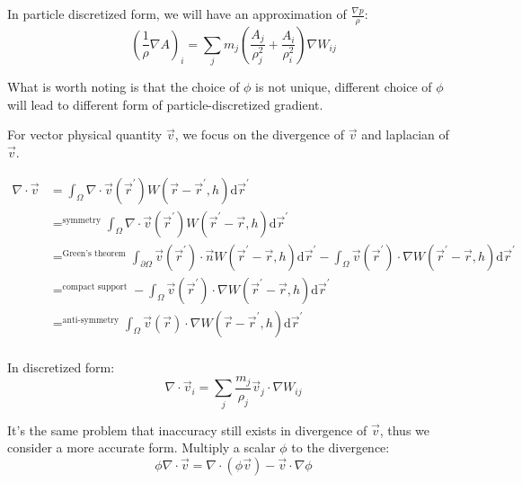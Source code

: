 In particle discretized form, we will have an approximation of $\frac{\nabla p}{\rho}$:
\begin{equation}
    \left(\frac{1}{\rho}\nabla A\right)_i
    =
    \sum_j m_j
    \left(
        \frac{A_j}{\rho_j^2}
        +
        \frac{A_i}{\rho_i^2}
    \right)\nabla W_{ij}
\end{equation}

What is worth noting
is that the choice of $\phi$ is not unique, 
different choice of $\phi$ will lead to different form of particle-discretized gradient.

For vector physical quantity $\vec{v}$,
we focus on the divergence of $\vec{v}$ and laplacian of $\vec{v}$.

\begin{equation}
    \begin{aligned}
        \nabla\cdot \vec{v} &=
        \int_{\Omega} \nabla\cdot \vec{v}(\vec{r}^\prime) W(\vec{r} - \vec{r}^\prime,h)\mathrm{d}\vec{r}^\prime \\
        &\mathop{=}^{\text{symmetry}}
        \int_{\Omega} \nabla\cdot \vec{v}(\vec{r}^\prime) W(\vec{r}^\prime-\vec{r},h)\mathrm{d}\vec{r}^\prime\\
        &\mathop{=}^{\text{Green's theorem}}
        \int_{\partial\Omega} \vec{v}(\vec{r}^\prime) \cdot \vec{n} W(\vec{r}^\prime-\vec{r},h)\mathrm{d}\vec{r}^\prime
        - \int_{\Omega} \vec{v}(\vec{r}^\prime) \cdot \nabla W(\vec{r}^\prime-\vec{r},h)\mathrm{d}\vec{r}^\prime\\
        &\mathop{=}^{\text{compact support}}
        - \int_{\Omega} \vec{v}(\vec{r}^\prime) \cdot \nabla W(\vec{r}^\prime-\vec{r},h)\mathrm{d}\vec{r}^\prime\\
        &\mathop{=}^{\text{anti-symmetry}}
        \int_{\Omega} \vec{v}(\vec{r}) \cdot \nabla W(\vec{r}-\vec{r}^\prime,h)\mathrm{d}\vec{r}^\prime\\
    \end{aligned}
\end{equation}

In discretized form:
\begin{equation}
    \nabla\cdot \vec{v}_i = \sum_j \frac{m_j}{\rho_j} \vec{v}_j \cdot \nabla W_{ij}
\end{equation}

It's the same problem that inaccuracy still exists in divergence of $\vec{v}$, 
thus we consider a more accurate form.
Multiply a scalar $\phi$ to the divergence:
\begin{equation}
    \phi\nabla\cdot \vec{v} = \nabla\cdot(\phi \vec{v}) - \vec{v}\cdot\nabla\phi
\end{equation}

